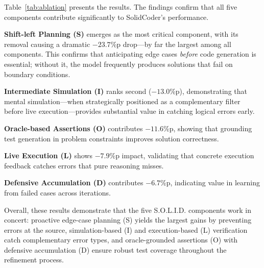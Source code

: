 \documentclass[11pt]{article}
\begin{document}
Table~\ref{tab:ablation} presents the results. The findings confirm that all five components contribute significantly to SolidCoder's performance.

\textbf{Shift-left Planning (S)} emerges as the most critical component, with its removal causing a dramatic $-23.7$\%p drop---by far the largest among all components. This confirms that anticipating edge cases \emph{before} code generation is essential; without it, the model frequently produces solutions that fail on boundary conditions.

\textbf{Intermediate Simulation (I)} ranks second ($-13.0$\%p), demonstrating that mental simulation---when strategically positioned as a complementary filter before live execution---provides substantial value in catching logical errors early. 

\textbf{Oracle-based Assertions (O)} contributes $-11.6$\%p, showing that grounding test generation in problem constraints improves solution correctness.

\textbf{Live Execution (L)} shows $-7.9$\%p impact, validating that concrete execution feedback catches errors that pure reasoning misses. 

\textbf{Defensive Accumulation (D)} contributes $-6.7$\%p, indicating value in learning from failed cases across iterations.

Overall, these results demonstrate that the five S.O.L.I.D. components work in concert: proactive edge-case planning (S) yields the largest gains by preventing errors at the source, simulation-based (I) and execution-based (L) verification catch complementary error types, and oracle-grounded assertions (O) with defensive accumulation (D) ensure robust test coverage throughout the refinement process.
\end{document}
